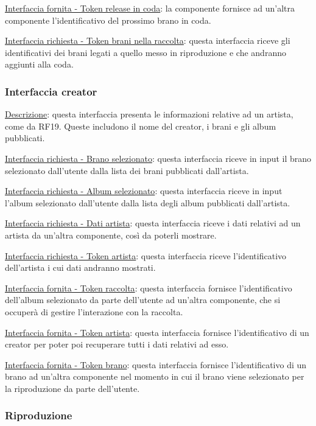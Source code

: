 \documentclass[a4paper,12pt]{article}
\begin{document}
\underline{Interfaccia fornita - Token release in coda}: la componente fornisce ad un’altra componente l’identificativo del prossimo brano in coda.

\underline{Interfaccia richiesta - Token brani nella raccolta}: questa interfaccia riceve gli identificativi dei brani legati a quello messo in riproduzione e che andranno aggiunti alla coda.

\subsubsection{Interfaccia creator}

\underline{Descrizione}: questa interfaccia presenta le informazioni relative ad un artista, come da RF19. Queste includono il nome del creator, i brani e gli album pubblicati.

\underline{Interfaccia richiesta - Brano selezionato}: questa interfaccia riceve in input il brano selezionato dall’utente dalla lista dei brani pubblicati dall’artista.

\underline{Interfaccia richiesta - Album selezionato}: questa interfaccia riceve in input l’album selezionato dall’utente dalla lista degli album pubblicati dall’artista.

\underline{Interfaccia richiesta - Dati artista}: questa interfaccia riceve i dati relativi ad un artista da un’altra componente, così da poterli mostrare.

\underline{Interfaccia richiesta - Token artista}: questa interfaccia riceve l’identificativo dell’artista i cui dati andranno mostrati. 

\underline{Interfaccia fornita - Token raccolta}: questa interfaccia  fornisce l’identificativo dell'album selezionato da parte dell’utente ad un’altra componente, che si occuperà di gestire l’interazione con la raccolta.

\underline{Interfaccia fornita - Token artista}: questa interfaccia  fornisce l’identificativo di un creator per poter poi recuperare tutti i dati relativi ad esso.

\underline{Interfaccia fornita - Token brano}: questa interfaccia fornisce l’identificativo di un brano ad un’altra componente nel momento in cui il brano viene selezionato per la riproduzione da parte dell’utente.

\subsubsection{Riproduzione}
\end{document}
